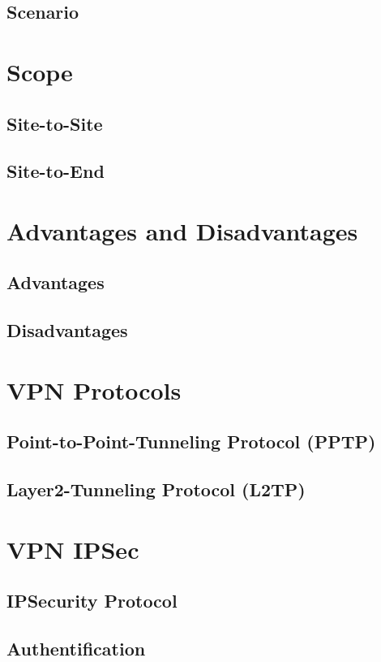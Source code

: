 \documentclass[11pt,a4paper]{article}
\begin{document}
\subsection{Scenario}
\newpage

\section{Scope}
\subsection{Site-to-Site}
\subsection{Site-to-End}
\newpage

\section{Advantages and Disadvantages}
\subsection{Advantages}
\subsection{Disadvantages}
\newpage

\section{VPN Protocols}
\subsection{Point-to-Point-Tunneling Protocol (PPTP)}
\subsection{Layer2-Tunneling Protocol (L2TP)}
\newpage

\section{VPN IPSec}
\subsection{IPSecurity Protocol}
\subsection{Authentification}
\end{document}
